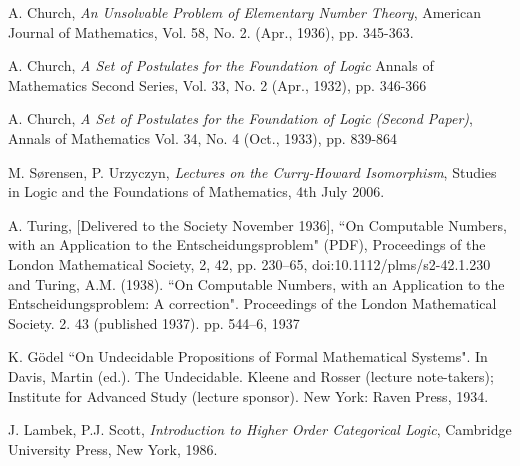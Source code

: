 \documentclass[12pt]{article}
\theoremstyle{plane}
\theoremstyle{definition}
\begin{document}
	\begin{thebibliography}{9}
		 A. Church, \emph{An Unsolvable Problem of Elementary Number Theory}, American Journal of Mathematics, Vol. 58, No. 2. (Apr., 1936), pp. 345-363.
		
		 A. Church, \emph{A Set of Postulates for the Foundation of Logic} Annals of Mathematics
		Second Series, Vol. 33, No. 2 (Apr., 1932), pp. 346-366 
		
		 A. Church, \emph{A Set of Postulates for the Foundation of Logic (Second Paper)}, Annals of Mathematics
		Vol. 34, No. 4 (Oct., 1933), pp. 839-864
		
		 M. Sørensen, P. Urzyczyn, \emph{Lectures on the Curry-Howard Isomorphism}, Studies in Logic and the Foundations of Mathematics, 4th July 2006.
		
		 A. Turing, [Delivered to the Society November 1936], ``On Computable Numbers, with an Application to the Entscheidungsproblem" (PDF), Proceedings of the London Mathematical Society, 2, 42, pp. 230–65, doi:10.1112/plms/s2-42.1.230 and Turing, A.M. (1938). ``On Computable Numbers, with an Application to the Entscheidungsproblem: A correction". Proceedings of the London Mathematical Society. 2. 43 (published 1937). pp. 544–6, 1937
		
		 K. Gödel ``On Undecidable Propositions of Formal Mathematical Systems". In Davis, Martin (ed.). The Undecidable. Kleene and Rosser (lecture note-takers); Institute for Advanced Study (lecture sponsor). New York: Raven Press, 1934.
		
		 J. Lambek, P.J. Scott, \emph{Introduction to Higher Order Categorical Logic}, Cambridge University Press, New York, 1986.
	\end{thebibliography}
	
	
\end{document}
